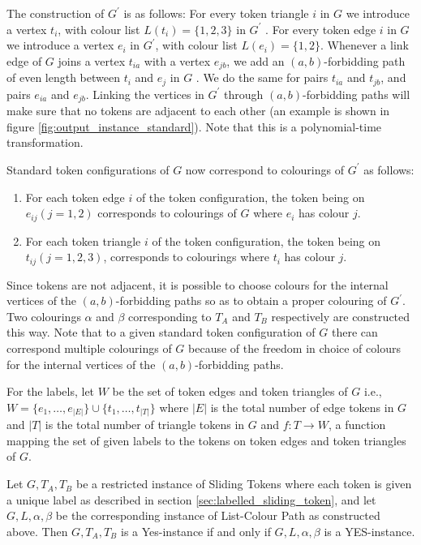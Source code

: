 The construction of $G^{'}$ is as follows: For every token triangle $i$ in $G$ we introduce a vertex $t_{i}$, with colour list
$L(t_{i}) = \{1, 2, 3\}$ in $G^{'}$ . For every token edge $i$ in $G$ we introduce a vertex $e_{i}$ in $G^{'}$, with colour
list $L(e_{i}) = \{1, 2\}$. Whenever a link edge of $G$ joins a vertex $t_{ia}$ with a vertex $e_{jb}$, we add an $(a, b)$-forbidding
path of even length between $t_{i}$ and $e_{j}$ in $G$ . We do the same for pairs $t_{ia}$ and $t_{jb}$, and pairs $e_{ia}$ and $e_{jb}$.
Linking the vertices in $G^{'}$ through $(a, b)$-forbidding paths will make sure that no tokens are adjacent to each other (an example is
shown in figure \ref{fig:output_instance_standard}). Note that this is a polynomial-time transformation.

Standard token configurations of $G$ now correspond to colourings of $G^{'}$ as follows:
\begin{enumerate}
    \item For each token edge $i$ of the token configuration, the token being on $e_{ij} (j = 1, 2 )$
    corresponds to colourings of $G$ where $e_{i}$ has colour $j$.
    \item For each token triangle $i$ of the token configuration, the token being on $t_{ij} (j = 1, 2, 3)$,
    corresponds to colourings where $t_{i}$ has colour $j$.
\end{enumerate}

Since tokens are not adjacent, it is possible to choose colours for the internal vertices of the $(a, b)$-forbidding paths so as to
obtain a proper colouring of $G^{'}$. Two colourings $\alpha$ and $\beta$ corresponding to $T_{A}$ and $T_{B}$ respectively are constructed
this way. Note that to a given standard token configuration of $G$ there can correspond multiple colourings of $G$ because of the freedom
in choice of colours for the internal vertices of the $(a, b)$-forbidding paths.

For the labels, let $W$ be the set of token edges and token triangles of $G$ i.e., $W = \{e_1,\dots, e_{|E|} \} \cup \{t_1,\dots, t_{|T|} \}$
where $|E|$ is the total number of edge tokens in $G$ and $|T|$ is the total number of triangle tokens in $G$
and $f: T \rightarrow W$, a function mapping the set of given labels to the tokens on token edges and token triangles of $G$.

\begin{claim} Let $G, T_A, T_B$ be a restricted instance of Sliding Tokens where each token is given a unique label as described in
section \ref{sec:labelled_sliding_token}, and let $G , L, \alpha, \beta$ be the corresponding instance of List-Colour Path as constructed above.
Then $G, T_A, T_B$ is a Yes-instance if and only if $G , L, \alpha, \beta$ is a YES-instance.
\end{claim}\label{theorem:labelled_sliding}

